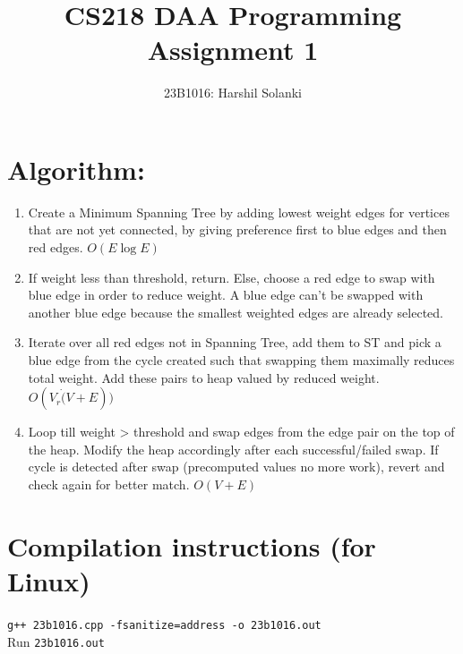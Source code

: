\documentclass{article}
\title{CS218 DAA Programming Assignment 1}
\author{23B1016: Harshil Solanki}
\begin{document}
 
\maketitle
\section*{Algorithm:}
\begin{enumerate}
    \item Create a Minimum Spanning Tree by adding lowest weight edges for vertices that are not yet connected, by giving preference first to blue edges and then red edges. $ O(E\log E)$
    \item If weight less than threshold, return. Else, choose a red edge to swap with blue edge in order to reduce weight. A blue edge can't be swapped with another blue edge because the smallest weighted edges are already selected.
    \item Iterate over all red edges not in Spanning Tree, add them to ST and pick a blue edge from the cycle created such that swapping them maximally reduces total weight. Add these pairs to heap valued by reduced weight. $O(V_r \dot (V+E))$
    \item Loop till weight > threshold and swap edges from the edge pair on the top of the heap. Modify the heap accordingly after each successful/failed swap. If cycle is detected after swap (precomputed values no more work), revert and check again for better match. $O(V+E)$
\end{enumerate}
\section*{Compilation instructions (for Linux)}
\texttt{g++ 23b1016.cpp -fsanitize=address -o 23b1016.out}\\
Run \texttt{23b1016.out}
\end{document}
